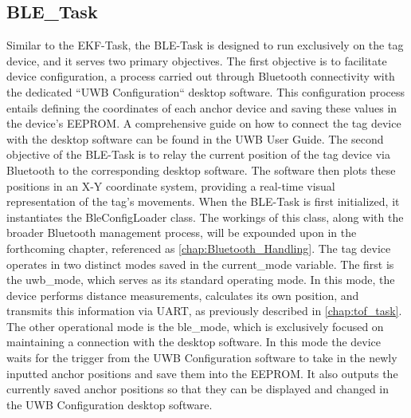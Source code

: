 \subsection{BLE\_Task}
\label{sec:Ble_Task}
Similar to the EKF-Task, the BLE-Task is designed to run exclusively on the tag device, and it serves two primary objectives.
\vspace{4pt}
\newline
The first objective is to facilitate device configuration, a process carried out through Bluetooth connectivity with the dedicated ``UWB Configuration`` desktop software. This configuration process entails defining the coordinates of each anchor device and saving these values in the device's EEPROM. A comprehensive guide on how to connect the tag device with the desktop software can be found in the UWB User Guide.
\vspace{4pt}
\newline
The second objective of the BLE-Task is to relay the current position of the tag device via Bluetooth to the corresponding desktop software. The software then plots these positions in an X-Y coordinate system, providing a real-time visual representation of the tag's movements.
\vspace{4pt}
\newline
When the BLE-Task is first initialized, it instantiates the BleConfigLoader class. The workings of this class, along with the broader Bluetooth management process, will be expounded upon in the forthcoming chapter, referenced as \ref{chap:Bluetooth_Handling}.
\vspace{4pt}
\newline
The tag device operates in two distinct modes saved in the current\_mode variable. The first is the uwb\_mode, which serves as its standard operating mode. In this mode, the device performs distance measurements, calculates its own position, and transmits this information via UART, as previously described in \ref{chap:tof_task}.
\vspace{4pt}
\newline
The other operational mode is the ble\_mode, which is exclusively focused on maintaining a connection with the desktop software. 
In this mode the device waits for the trigger from the UWB Configuration software to take in the newly inputted anchor positions and save them into the EEPROM. 
It also outputs the currently saved anchor positions so that they can be displayed and changed in the UWB Configuration desktop software. 

